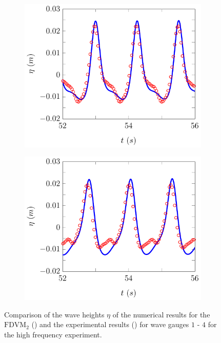 \begin{figure}
\begin{subfigure}{0.5\textwidth}
	\end{subfigure}
	\begin{subfigure}{0.5\textwidth}
		\includegraphics[width=\textwidth]{./chp6/figures/Experiment/Beji/sh/FDVMWG3.pdf}
		\vspace{0.5cm}
	\end{subfigure}%
	\begin{subfigure}{0.5\textwidth}
		\includegraphics[width=\textwidth]{./chp6/figures/Experiment/Beji/sh/FDVMWG4.pdf}
		\vspace{0.5cm}
	\end{subfigure}
	\caption{Comparison of the wave heights $\eta$ of the numerical results for the $\text{FDVM}_2$ ({\color{blue}\solidrule}) and the experimental results () for wave gauges $1$ - $4$ for the high frequency experiment.}
	\label{fig:BejishWG1to4FDVM}
\end{figure}

